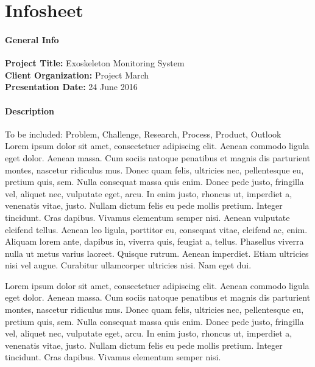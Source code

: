 \chapter{Infosheet}
\pagebreak
\begin{small}
\subsubsection{General Info}
{\bfseries Project Title:} Exoskeleton Monitoring System\\
{\bfseries Client Organization:} Project March\\
{\bfseries Presentation Date:} 24 June 2016

\subsubsection{Description}
To be included: Problem, Challenge, Research, Process, Product, Outlook\\
Lorem ipsum dolor sit amet, consectetuer adipiscing elit. Aenean commodo ligula eget dolor. Aenean massa. Cum sociis natoque penatibus et magnis dis parturient montes, nascetur ridiculus mus. Donec quam felis, ultricies nec, pellentesque eu, pretium quis, sem. Nulla consequat massa quis enim. Donec pede justo, fringilla vel, aliquet nec, vulputate eget, arcu. In enim justo, rhoncus ut, imperdiet a, venenatis vitae, justo. Nullam dictum felis eu pede mollis pretium. Integer tincidunt. Cras dapibus. Vivamus elementum semper nisi. Aenean vulputate eleifend tellus. Aenean leo ligula, porttitor eu, consequat vitae, eleifend ac, enim. Aliquam lorem ante, dapibus in, viverra quis, feugiat a, tellus. Phasellus viverra nulla ut metus varius laoreet. Quisque rutrum. Aenean imperdiet. Etiam ultricies nisi vel augue. Curabitur ullamcorper ultricies nisi. Nam eget dui.

Lorem ipsum dolor sit amet, consectetuer adipiscing elit. Aenean commodo ligula eget dolor. Aenean massa. Cum sociis natoque penatibus et magnis dis parturient montes, nascetur ridiculus mus. Donec quam felis, ultricies nec, pellentesque eu, pretium quis, sem. Nulla consequat massa quis enim. Donec pede justo, fringilla vel, aliquet nec, vulputate eget, arcu. In enim justo, rhoncus ut, imperdiet a, venenatis vitae, justo. Nullam dictum felis eu pede mollis pretium. Integer tincidunt. Cras dapibus. Vivamus elementum semper nisi.


\end{small}
